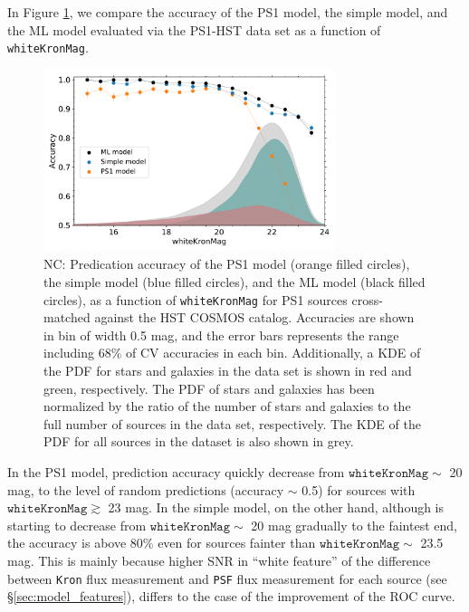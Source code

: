 \documentclass[twocolumn]{aastex62}
\newcommand{\NC}[1]{{\color{brown} NC: {#1}}}
\begin{document}
{In Figure \ref{fig:cvacc_hst}, we compare the accuracy 
of the PS1 model, the simple model, and the ML model
evaluated via the PS1-HST data set as a function of \texttt{whiteKronMag}. 
\begin{figure}[t]
 \centering
  \includegraphics[width=3.35in, bb = 0 0 576 360]{./Figures/CV_Accuracy_HST.pdf}
  \caption{
  \NC{
  Predication accuracy of the PS1 model (orange filled circles), the simple model (blue filled circles), 
  and the ML model (black filled circles), as a function of \texttt{whiteKronMag} 
  for PS1 sources cross-matched against the HST COSMOS catalog. 
  Accuracies are shown in bin of width 0.5 mag, and the error bars 
  represents the range including 68\% of CV accuracies in each bin. 
  Additionally, a KDE of the PDF for stars and galaxies in the data set is shown in red and green, respectively. 
  The PDF of stars and galaxies has been normalized by the ratio of the number of stars and galaxies 
  to the full number of sources in the data set, respectively. 
  The KDE of the PDF for all sources in the dataset is also shown in grey.
  }
  }
  \label{fig:cvacc_hst}
\end{figure}
In the PS1 model, prediction accuracy quickly decrease from $\mathtt{whiteKronMag} \sim $ 20 mag, 
to the level of random predictions (accuracy $\sim$ 0.5) for sources with $\mathtt{whiteKronMag} \gtrsim $ 23 mag. 
In the simple model, on the other hand, 
although is starting to decrease from $\mathtt{whiteKronMag} \sim $ 20 mag gradually to the faintest end, 
the accuracy is above 80\% even for sources fainter than $\mathtt{whiteKronMag} \sim $ 23.5 mag. 
This is mainly because higher SNR in ``white feature'' of the difference 
between \texttt{Kron} flux measurement and \texttt{PSF} flux measurement for each source (see \S\ref{sec:model_features}), 
differs to the case of the improvement of the ROC curve. 

}
\end{document}
